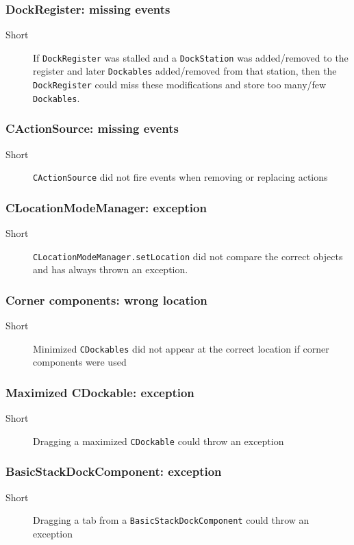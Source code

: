 \documentclass[a4paper,10pt]{article}
\newcommand{\src}[1]{\lstinline[basicstyle=\normalsize\ttfamily,keywordstyle=\normalsize\ttfamily,identifierstyle=\normalsize\ttfamily]|#1|}
\newcommand{\short}{\item[Short]}
\begin{document}
\subsubsection{DockRegister: missing events}
\begin{description}
 \short If \src{DockRegister} was stalled and a \src{DockStation} was added/removed to the register and later \src{Dockables} added/removed from that station, then the \src{DockRegister} could miss these modifications and store too many/few \src{Dockables}.
\end{description}


\subsubsection{CActionSource: missing events}
\begin{description}
 \short \src{CActionSource} did not fire events when removing or replacing actions
\end{description}
 
\subsubsection{CLocationModeManager: exception}
\begin{description}
 \short \src{CLocationModeManager.setLocation} did not compare the correct objects and has always thrown an exception.
\end{description}

\subsubsection{Corner components: wrong location}
\begin{description}
 \short Minimized \src{CDockables} did not appear at the correct location if corner components were used
\end{description}

\subsubsection{Maximized CDockable: exception}
\begin{description}
 \short Dragging a maximized \src{CDockable} could throw an exception
\end{description}


\subsubsection{BasicStackDockComponent: exception}
\begin{description}
 \short Dragging a tab from a \src{BasicStackDockComponent} could throw an exception
\end{description}
\end{document}
